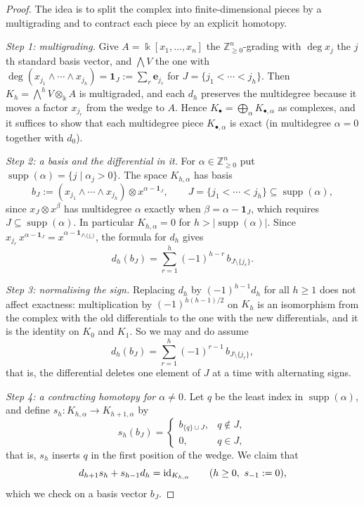\begin{proof}
The idea is to split the complex into finite-dimensional pieces by a multigrading and to contract each piece by an explicit homotopy.

\emph{Step 1: multigrading.}
Give $A=\Bbbk[x_1,\ldots,x_n]$ the $\mathbb Z_{\geq0}^n$-grading with $\deg x_j$ the $j$th standard basis vector, and $\bigwedge V$ the one with $\deg(x_{j_1}\wedge\cdots\wedge x_{j_h})=\mathbf1_J:=\sum_r\mathbf e_{j_r}$ for $J=\{j_1<\cdots<j_h\}$.
Then $K_h=\bigwedge^hV\otimes_\Bbbk A$ is multigraded, and each $d_h$ preserves the multidegree because it moves a factor $x_{j_r}$ from the wedge to $A$.
Hence $K_\bullet=\bigoplus_\alpha K_{\bullet,\alpha}$ as complexes, and it suffices to show that each multidegree piece $K_{\bullet,\alpha}$ is exact (in multidegree $\alpha=0$ together with $d_0$).

\emph{Step 2: a basis and the differential in it.}
For $\alpha\in\mathbb Z_{\geq0}^n$ put $\operatorname{supp}(\alpha)=\{j\mid\alpha_j>0\}$.
The space $K_{h,\alpha}$ has basis
\[
b_J:=(x_{j_1}\wedge\cdots\wedge x_{j_h})\otimes x^{\alpha-\mathbf1_J},
\qquad
J=\{j_1<\cdots<j_h\}\subseteq\operatorname{supp}(\alpha),
\]
since $x_J\otimes x^\beta$ has multidegree $\alpha$ exactly when $\beta=\alpha-\mathbf1_J$, which requires $J\subseteq\operatorname{supp}(\alpha)$.
In particular $K_{h,\alpha}=0$ for $h>|\operatorname{supp}(\alpha)|$.
Since $x_{j_r}\,x^{\alpha-\mathbf1_J}=x^{\alpha-\mathbf1_{J\setminus\{j_r\}}}$, the formula for $d_h$ gives
\[
d_h(b_J)=\sum_{r=1}^h(-1)^{h-r}\,b_{J\setminus\{j_r\}}.
\]

\emph{Step 3: normalising the sign.}
Replacing $d_h$ by $(-1)^{h-1}d_h$ for all $h\geq1$ does not affect exactness: multiplication by $(-1)^{h(h-1)/2}$ on $K_h$ is an isomorphism from the complex with the old differentials to the one with the new differentials, and it is the identity on $K_0$ and $K_1$.
So we may and do assume
\[
d_h(b_J)=\sum_{r=1}^h(-1)^{r-1}\,b_{J\setminus\{j_r\}},
\]
that is, the differential deletes one element of $J$ at a time with alternating signs.

\emph{Step 4: a contracting homotopy for $\alpha\neq0$.}
Let $q$ be the least index in $\operatorname{supp}(\alpha)$, and define $s_h:K_{h,\alpha}\to K_{h+1,\alpha}$ by
\[
s_h(b_J)=
\begin{cases}
b_{\{q\}\cup J},&q\notin J,\\
0,&q\in J,
\end{cases}
\]
that is, $s_h$ inserts $q$ in the first position of the wedge.
We claim that
\[
d_{h+1}s_h+s_{h-1}d_h=\id_{K_{h,\alpha}}\qquad(h\geq0,\ s_{-1}:=0),
\]
which we check on a basis vector $b_J$.


\end{proof}
